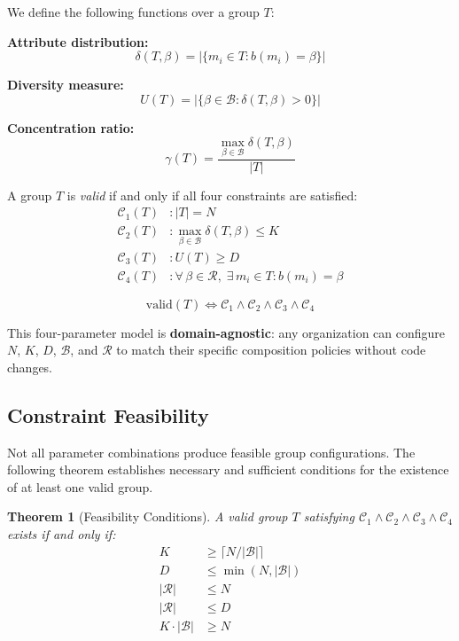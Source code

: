 \documentclass[11pt,a4paper]{article}
\theoremstyle{plain}
\newtheorem{theorem}{Theorem}
\theoremstyle{definition}
\begin{document}
We define the following functions over a group $T$:

\textbf{Attribute distribution:}
\begin{equation}
    \delta(T, \beta) = |\{m_i \in T : b(m_i) = \beta\}|
\end{equation}

\textbf{Diversity measure:}
\begin{equation}
    U(T) = |\{\beta \in \mathcal{B} : \delta(T, \beta) > 0\}|
\end{equation}

\textbf{Concentration ratio:}
\begin{equation}
    \gamma(T) = \frac{\max_{\beta \in \mathcal{B}} \delta(T, \beta)}{|T|}
\end{equation}

A group $T$ is \emph{valid} if and only if all four constraints are satisfied:
\begin{align}
    \mathcal{C}_1(T) &: |T| = N \label{eq:c1} \\
    \mathcal{C}_2(T) &: \max_{\beta \in \mathcal{B}} \delta(T, \beta) \leq K \label{eq:c2} \\
    \mathcal{C}_3(T) &: U(T) \geq D \label{eq:c3} \\
    \mathcal{C}_4(T) &: \forall\, \beta \in \mathcal{R},\; \exists\, m_i \in T : b(m_i) = \beta \label{eq:c4}
\end{align}

\begin{equation}
    \text{valid}(T) \iff \mathcal{C}_1 \wedge \mathcal{C}_2 \wedge \mathcal{C}_3 \wedge \mathcal{C}_4
\end{equation}

This four-parameter model is \textbf{domain-agnostic}: any organization can configure $N$, $K$, $D$, $\mathcal{B}$, and $\mathcal{R}$ to match their specific composition policies without code changes.

\subsection{Constraint Feasibility}

Not all parameter combinations produce feasible group configurations. The following theorem establishes necessary and sufficient conditions for the existence of at least one valid group.

\begin{theorem}[Feasibility Conditions]
\label{thm:feasibility}
A valid group $T$ satisfying $\mathcal{C}_1 \wedge \mathcal{C}_2 \wedge \mathcal{C}_3 \wedge \mathcal{C}_4$ exists if and only if:
\begin{align}
    K &\geq \lceil N / |\mathcal{B}| \rceil \label{eq:feas1} \\
    D &\leq \min(N, |\mathcal{B}|) \label{eq:feas2} \\
    |\mathcal{R}| &\leq N \label{eq:feas3} \\
    |\mathcal{R}| &\leq D \label{eq:feas4} \\
    K \cdot |\mathcal{B}| &\geq N \label{eq:feas5}
\end{align}
\end{theorem}
\end{document}
